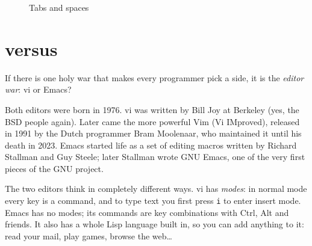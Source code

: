 \begin{figure}[htbp]
  \centering
  \caption{Tabs and spaces}
  \label{fig:tabs}
\end{figure}

\section{\texorpdfstring{}{Vim} versus \texorpdfstring{}{Emacs}}

If there is one holy war that makes every programmer pick a side, it is the \emph{editor war}: vi or Emacs?

Both editors were born in 1976. vi was written by Bill Joy at Berkeley (yes, the BSD people again). Later came the more powerful Vim (Vi IMproved), released in 1991 by the Dutch programmer Bram Moolenaar, who maintained it until his death in 2023. Emacs started life as a set of editing macros written by Richard Stallman and Guy Steele; later Stallman wrote GNU Emacs, one of the very first pieces of the GNU project.

The two editors think in completely different ways. vi has \emph{modes}: in normal mode every key is a command, and to type text you first press \texttt{i} to enter insert mode. Emacs has no modes; its commands are key combinations with Ctrl, Alt and friends. It also has a whole Lisp language built in, so you can add anything to it: read your mail, play games, browse the web\ldots{}

